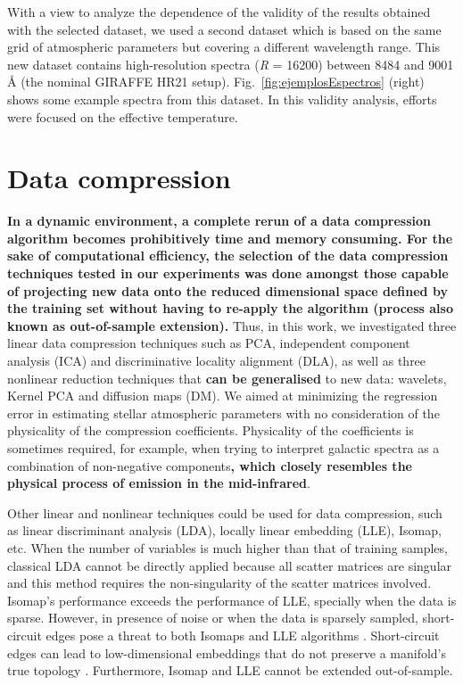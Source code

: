 \documentclass[a4paper,fleqn,usenatbib]{mnras}
\begin{document}
With a view to analyze the dependence of the validity of the results obtained 
with the selected dataset, we used a second dataset which is based on the same 
grid of atmospheric parameters but covering a different wavelength range. 
This new dataset contains high-resolution spectra (\textit{R} = 16200) between 
8484 and 9001 {\AA} (the nominal GIRAFFE HR21 setup). 
Fig.~\ref{fig:ejemplosEspectros} (right) shows some example spectra from 
this dataset. In this validity analysis, efforts were focused on the 
effective temperature.

\section{Data compression}
\label{sec:dimred}

{\bf In a dynamic environment, a complete rerun of a data compression 
algorithm becomes prohibitively time and memory consuming. 
For the sake of computational efficiency, the selection of the data
compression techniques tested in our experiments was done amongst those
capable of projecting new data onto the reduced dimensional space
defined by the training set without having to re-apply the algorithm
(process also known as out-of-sample extension).}
Thus, in this work, we investigated three linear data compression 
techniques such as PCA, independent component analysis (ICA) and 
discriminative locality alignment (DLA), as well as three nonlinear 
reduction techniques that {\bf can be generalised} to new data: wavelets,
Kernel PCA and diffusion maps (DM).  We aimed at minimizing the
regression error in estimating stellar atmospheric parameters with no
consideration of the physicality of the compression
coefficients. Physicality of the coefficients is sometimes required,
for example, when trying to interpret galactic spectra as a
combination of non-negative components{\bf, which closely resembles the
physical process of emission in the mid-infrared}.

Other linear and nonlinear techniques could be used for data
compression, such as linear discriminant analysis (LDA), locally linear
embedding (LLE), Isomap, etc. When the number of variables is much
higher than that of training samples, classical LDA cannot be directly
applied because all scatter matrices are singular and this method
requires the non-singularity of the scatter matrices involved.
Isomap's performance exceeds the performance of LLE, specially when
the data is sparse. However, in presence of noise or when the data is
sparsely sampled, short-circuit edges pose a threat to both Isomaps
and LLE algorithms \citep{saxena:04}. Short-circuit edges can lead to
low-dimensional embeddings that do not preserve a manifold's true
topology \citep{balasubramanianISOMAP:02}. Furthermore, Isomap and LLE
cannot be extended out-of-sample. 
\end{document}
